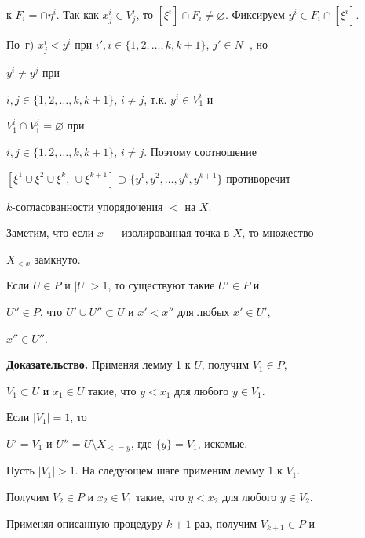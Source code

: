 к $F_i=\cap\eta^i$. Так как $x^i_j\in V^i_j$, то $[\xi^i]\cap 


F_i\ne\varnothing$. Фиксируем $y^i\in F_i\cap[\xi^i]$. 


По~г) $x^i_j<y^i$ при $i',i\in\{1,2,\dotsc,k,k+1\}$, $j'\in N^+$, но 


$y^i\ne y^j$ при  


$i,j\in\{1,2,\dotsc,k,k+1\}$, $i\ne j$, т.к. $y^i\in V^i_1$ и 


$V^i_1\cap V^j_1=\varnothing$ при 


$i,j\in\{1,2,\dotsc,k,k+1\}$, $i\ne j$. Поэтому соотношение  


$[\xi^1\cup\xi^2\cup\xi^k,\,\cup\xi^{k+1}]\supset 


\{y^1,y^2,\dotsc,y^k,y^{k+1}\}$ противоречит  


$k$-согласованности упорядочения $<$ на $X$. 


 


Заметим, что если $x$ --- изолированная точка в $X$, то множество  


$X_{<x}$ замкнуто. 


 


\begin{lem} 


Если $U\in P$ и $|U|>1$, то существуют такие $U'\in P$ и 


$U''\in P$, что $U'\cup U''\subset U$ и $x'<x''$ для любых $x'\in U'$, 


$x''\in U''$. 


\end{lem} 


 


{\bf Доказательство.} Применяя лемму 1 к $U$, получим $V_1\in P$, 


$V_1\subset U$ и $x_1\in U$ такие, что $y<x_1$ для любого $y\in V_1$. 


Если $|V_1|=1$, то  


$U'=V_1$ и $U''=U\setminus X_{<=y}$, где $\{y\}=V_1$, искомые. 


 


Пусть $|V_1|>1$. На следующем шаге применим лемму 1 к $V_1$.  


Получим $V_2\in P$ и $x_2\in V_1$ такие, что $y<x_2$ для любого $y\in 


V_2$. 


Применяя описанную процедуру $k{+}1$ раз, получим $V_{k+1}\in P$ и  


